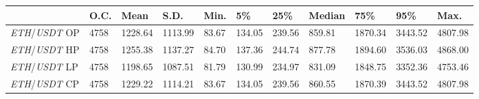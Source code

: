 \begin{tabular}{lllllllllll}
\toprule
 & \textbf{O.C.} & \textbf{Mean} & \textbf{S.D.} & \textbf{Min.} & \textbf{5\%} & \textbf{25\%} & \textbf{Median} & \textbf{75\%} & \textbf{95\%} & \textbf{Max.} \\
\midrule
\emph{ETH}/\emph{USDT} OP & 4758 & 1228.64 & 1113.99 & 83.67 & 134.05 & 239.56 & 859.81 & 1870.34 & 3443.52 & 4807.98 \\
\emph{ETH}/\emph{USDT} HP & 4758 & 1255.38 & 1137.27 & 84.70 & 137.36 & 244.74 & 877.78 & 1894.60 & 3536.03 & 4868.00 \\
\emph{ETH}/\emph{USDT} LP & 4758 & 1198.65 & 1087.51 & 81.79 & 130.99 & 234.97 & 831.09 & 1848.75 & 3352.36 & 4753.46 \\
\emph{ETH}/\emph{USDT} CP & 4758 & 1229.22 & 1114.21 & 83.67 & 134.05 & 239.56 & 860.55 & 1870.39 & 3443.52 & 4807.98 \\
\bottomrule
\end{tabular}
